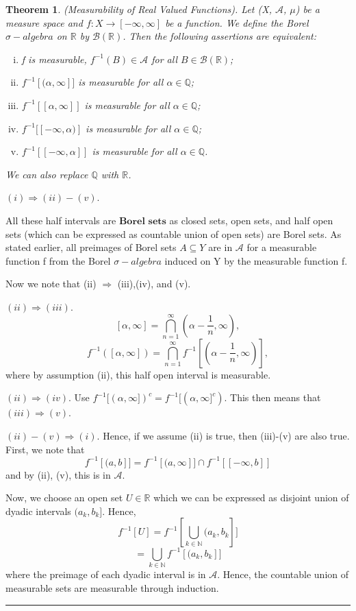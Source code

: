 \documentclass[twoside]{article}
\newcounter{lecnum}
\newtheorem{theorem}{Theorem}[lecnum]
\newenvironment{proof}{{\bf Proof:}}{\hfill\rule{2mm}{2mm}}
\newcommand{\sa}{\sigma-algebra}
\begin{document}
\begin{theorem}
(Measurability of Real Valued Functions). Let (X, $\mathcal{A}$, $\mu$) be a measure space and $f: X \rightarrow [-\infty, \infty]$ be a function. We define the Borel $\sa$ on $\mathbb{R}$ by $\mathcal{B}(\mathbb{R})$. Then the following assertions are equivalent:
\begin{center}
    \begin{enumerate}[(i)]
        \item f is measurable, $f^{-1}(B) \in \mathcal{A}$ for all $B \in \mathcal{B}(\mathbb{R})$;
        \item $f^{-1}[(\alpha, \infty]]$ is measurable for all $\alpha \in \mathbb{Q}$;
        \item $f^{-1}[[\alpha, \infty]]$ is measurable for all $\alpha \in \mathbb{Q}$;
        \item $f^{-1}[[-\infty, \alpha)]$ is measurable for all $\alpha \in \mathbb{Q}$;
        \item $f^{-1}[[-\infty, \alpha]]$ is measurable for all $\alpha \in \mathbb{Q}$.
    \end{enumerate}
\end{center}
We can also replace $\mathbb{Q}$ with $\mathbb{R}$.
\end{theorem}

\begin{proof}
$(i) \Rightarrow (ii)-(v)$.

All these half intervals are $\textbf{Borel sets}$ as closed sets, open sets, and half open sets (which can be expressed as countable union of open sets) are Borel sets. As stated earlier, all preimages of Borel sets $A \subseteq Y$ are in $\mathcal{A}$ for a measurable function f from the Borel $\sa$ induced on Y by the measurable function f.  

Now we note that (ii) $\Rightarrow$ (iii),(iv), and (v).

$(ii) \Rightarrow (iii)$.
$$
[\alpha, \infty] = \bigcap_{n=1}^{\infty}(\alpha - \frac{1}{n}, \infty),
$$
$$
f^{-1}([\alpha, \infty])= \bigcap_{n=1}^{\infty}f^{-1}[(\alpha - \frac{1}{n}, \infty)],
$$
where by assumption (ii), this half open interval is measurable. 

$(ii) \Rightarrow (iv)$.
Use $f^{-1}[(\alpha,\infty])^c = f^{-1}[(\alpha,\infty]^c)$. This then means that $(iii) \Rightarrow (v)$.

$(ii)-(v) \Rightarrow (i)$.
Hence, if we assume (ii) is true, then (iii)-(v) are also true. First, we note that 
$$
f^{-1}[(a,b]] = f^{-1}[(a,\infty]] \cap f^{-1}[[-\infty,b]]
$$
and by (ii), (v), this is in $\mathcal{A}$.

Now, we choose an open set $U \in \mathbb{R}$ which we can be expressed as disjoint union of dyadic intervals $(a_k,b_k]$. Hence,
$$
f^{-1}[U] = f^{-1}[\bigcup_{k \in \mathbb{N}}(a_k,b_k]]
$$
$$
= \bigcup_{k \in \mathbb{N}}f^{-1}[(a_k,b_k]]
$$
where the preimage of each dyadic interval is in $\mathcal{A}$. Hence, the countable union of measurable sets are measurable through induction. 

\end{proof}
\end{document}

